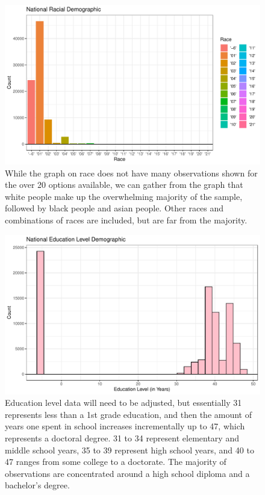 \documentclass{article}
\begin{document}
\begin{figure}[H]
\centering
\includegraphics{Thesis_Proposal-005}
\caption{While the graph on race does not have many observations shown for the over 20 options available, we can gather from the graph that white people make up the overwhelming majority of the sample, followed by black people and asian people. Other races and combinations of races are included, but are far from the majority.}
\label{Figure 4}
\end{figure}

\begin{figure}[H]
\centering
\includegraphics{Thesis_Proposal-006}
\caption{Education level data will need to be adjusted, but essentially 31 represents less than a 1st grade education, and then the amount of years one spent in school increases incrementally up to 47, which represents a doctoral degree. 31 to 34 represent elementary and middle school years, 35 to 39 represent high school years, and 40 to 47 ranges from some college to a doctorate. The majority of observations are concentrated around a high school diploma and a bachelor's degree.}
\label{Figure 5}
\end{figure}
\end{document}
